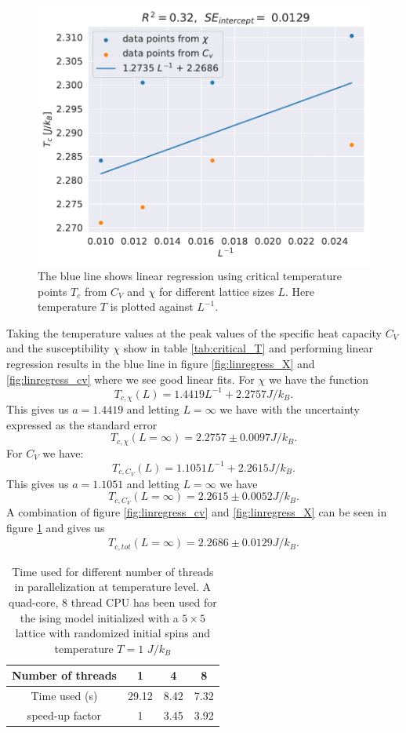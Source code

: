 \documentclass[english,notitlepage,reprint,nofootinbib]{revtex4-1}  %
\begin{document}
\begin{figure}[H]
    \centering
    \includegraphics[width=.5\textwidth]{../figures/linregress.pdf}
    \caption{The blue line shows linear regression using critical temperature points $T_c$ from $C_V$ and $\chi$ for different lattice sizes $L$. Here temperature $T$ is plotted against $L^{-1}$.}
    \label{fig:linregress}
\end{figure}
Taking the temperature values at the peak values of the specific heat capacity $C_V$ and the susceptibility $\chi$ show in table \ref{tab:critical_T} and performing linear regression results in the blue line in figure \ref{fig:linregress_X} and \ref{fig:linregress_cv} where we see good linear fits. For $\chi$ we have the function
\begin{equation}
    T_{c,\chi}(L) = 1.4419 L^{-1} + 2.2757  J/k_B.
\end{equation}
This gives us $a=1.4419$ and letting $L=\infty$ we have with the uncertainty expressed as the standard error
\begin{equation}
    T_{c,\chi}(L=\infty) = 2.2757 \pm 0.0097  J/k_B.
\end{equation}
For $C_V$ we have:
\begin{equation}
    T_{c,C_V}(L) = 1.1051 L^{-1} + 2.2615  J/k_B.
\end{equation}
This gives us $a=1.1051$ and letting $L=\infty$ we have
\begin{equation}
    T_{c,C_V}(L=\infty) = 2.2615 \pm 0.0052  J/k_B.
\end{equation}
A combination of figure \ref{fig:linregress_cv} and \ref{fig:linregress_X} can be seen in figure \ref{fig:linregress} and gives us
\begin{align}
    T_{c,tot}(L=\infty) = 2.2686 \pm 0.0129  J/k_B.
\end{align}
\begin{table}[H]
    \centering
    \caption{Time used for different number of threads in parallelization at temperature level. A quad-core, 8 thread CPU has been used for the ising model initialized with a $5\times5$ lattice with randomized initial spins and temperature $T= 1$ $J/k_B$}
    \label{tab:timing}
    \begin{tabular}{|c|c|c|c|}
        \hline
        Number of threads & 1     & 4    & 8    \\
        \hline
        Time used (s)     & 29.12 & 8.42 & 7.32 \\
        \hline
        speed-up factor   & 1     & 3.45 & 3.92 \\
        \hline
    \end{tabular}
\end{table}
\end{document}
